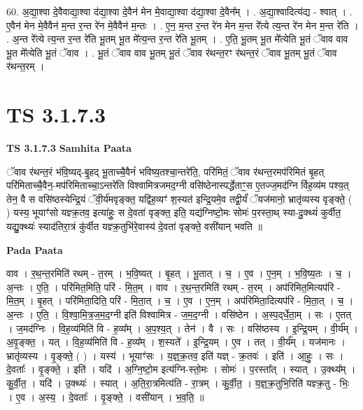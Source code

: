 \documentclass[17pt]{extarticle}
\begin{document}
60. अ॒द्या॒श्वा दे॒वैवाद्या॒श्वा द॑द्या॒श्वा दे॒वैन॑ मेन मे॒वाद्या॒श्वा द॑द्या॒श्वा दे॒वैन᳚म् । . अ॒द्या॒श्वादित्य॑द्य - श्वात् । . ए॒वैन॑ मेन मे॒वैवैन॑ म॒न्त र॒न्त रे॑न मे॒वैवैन॑ म॒न्तः । . ए॒न॒ म॒न्त र॒न्त रे॑न मेन म॒न्त रे᳚त्ये त्य॒न्त रे॑न मेन म॒न्त रे॑ति । . अ॒न्त रे᳚त्ये त्य॒न्त र॒न्त रे॑ति भू॒तम् भू॒त मे᳚त्य॒न्त र॒न्त रे॑ति भू॒तम् । . ए॒ति॒ भू॒तम् भू॒त मे᳚त्येति भू॒तं ॅवाव वाव भू॒त मे᳚त्येति भू॒तं ॅवाव । . भू॒तं ॅवाव वाव भू॒तम् भू॒तं ॅवाव र॑थन्त॒रꣳ र॑थन्त॒रं ॅवाव भू॒तम् भू॒तं ॅवाव र॑थन्त॒रम् । \newline
\pagebreak
{}

\section{ TS 3.1.7.3 }

\textbf{TS 3.1.7.3 } \newline
\textbf{Samhita Paata} \newline

ॅवाव र॑थन्त॒रं भ॑वि॒ष्यद्-बृ॒॒हद् भू॒ताच्चै॒वैनं॑ भविष्य॒तश्चा॒न्तरे॑ति॒, परि॑मितं॒ ॅवाव र॑थन्त॒रमप॑रिमितं बृ॒हत् परि॑मिताच्चै॒वैन॒-मप॑रिमिताच्चा॒ऽन्तरे॑ति विश्वामित्रजमद॒ग्नी वसि॑ष्ठेनास्पर्द्धेताꣳ॒॒स ए॒तज्ज॒मद॑ग्नि र्विह॒व्य॑म पश्य॒त् तेन॒ वै स वसि॑ष्ठस्येन्द्रि॒यं ॅवी॒र्य॑मवृङ्क्त॒ यद्वि॑ह॒व्यꣳ॑ श॒स्यत॑ इन्द्रि॒यमे॒व तद्वी॒र्यं॑ ॅयज॑मानो॒ भ्रातृ॑व्यस्य वृङ्क्ते॒ ( ) यस्य॒ भूयाꣳ॑सो यज्ञ्क्र॒तव॒ इत्या॑हुः॒ स दे॒वता॑ वृङ्क्त॒ इति॒ यद्य॑ग्निष्टो॒मः सोमः॑ प॒रस्ता॒थ् स्या-दु॒क्थ्यं॑ कुर्वीत॒ यद्यु॒क्थ्यः॑ स्याद॑तिरा॒त्रं कु॑र्वीत यज्ञ्क्र॒तुभि॑रे॒वास्य॑ दे॒वता॑ वृङ्क्ते॒ वसी॑यान् भवति ॥ \newline

\textbf{Pada Paata} \newline

वाव । र॒थ॒न्त॒रमिति॑ रथम् - त॒रम् । भ॒वि॒ष्यत् । बृ॒हत् । भू॒तात् । च॒ । ए॒व । ए॒न॒म् । भ॒वि॒ष्य॒तः । च॒ । अ॒न्तः । ए॒ति॒ । परि॑मित॒मिति॒ परि॑ - मि॒त॒म् । वाव । र॒थ॒न्त॒रमिति॑ रथम् - त॒रम् । अप॑रिमित॒मित्यप॑रि - मि॒त॒म् । बृ॒हत् । परि॑मिता॒दिति॒ परि॑ - मि॒ता॒त् । च॒ । ए॒व । ए॒न॒म् । अप॑रिमिता॒दित्यप॑रि - मि॒ता॒त् । च॒ । अ॒न्तः । ए॒ति॒ । वि॒श्वा॒मि॒त्र॒ज॒म॒द॒ग्नी इति॑ विश्वामित्र - ज॒म॒द॒ग्नी । वसि॑ष्ठेन । अ॒स्प॒द्‌र्धे॒ता॒म् । सः । ए॒तत् । ज॒मद॑ग्निः । वि॒ह॒व्य॑मिति॑ वि - ह॒व्य᳚म् । अ॒प॒श्य॒त् । तेन॑ । वै । सः । वसि॑ष्ठस्य । इ॒न्द्रि॒यम् । वी॒र्य᳚म् । अ॒वृ॒ङ्क्त॒ । यत् । वि॒ह॒व्य॑मिति॑ वि - ह॒व्य᳚म् । श॒स्यते᳚ । इ॒न्द्रि॒यम् । ए॒व । तत् । वी॒र्य᳚म् । यज॑मानः । भ्रातृ॑व्यस्य । वृ॒ङ्क्ते॒ ( ) । यस्य॑ । भूयाꣳ॑सः । य॒ज्ञ्॒क्र॒तव॒ इति॑ यज्ञ् - क्र॒तवः॑ । इति॑ । आ॒हुः॒ । सः । दे॒वताः᳚ । वृ॒ङ्क्ते॒ । इति॑ । यदि॑ । अ॒ग्नि॒ष्टो॒म इत्य॑ग्नि-स्तो॒मः । सोमः॑ । प॒रस्ता᳚त् । स्यात् । उ॒क्थ्य᳚म् । कु॒र्वी॒त॒ । यदि॑ । उ॒क्थ्यः॑ । स्यात् । अ॒ति॒रा॒त्रमित्य॑ति - रा॒त्रम् । कु॒र्वी॒त॒ । य॒ज्ञ्॒क्र॒तुभि॒रिति॑ यज्ञ्क्र॒तु - भिः॒ । ए॒व । अ॒स्य॒ । दे॒वताः᳚ । वृ॒ङ्क्ते॒ । वसी॑यान् । भ॒व॒ति॒ ॥  \newline
\end{document}
